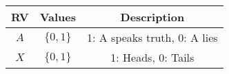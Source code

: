 
\begin{center}
\begin{tabular}{|c|c|c|}
\hline
\textbf{RV}& \textbf{Values} & \textbf{Description} \\ \hline
$A$		   & 	$\{0,1\}$		&   1: A speaks truth, 0: A lies\\ \hline
$X$ 		   & 	$\{0,1\}$	&	1: Heads, 0: Tails\\ \hline
\end{tabular}
\end{center}
